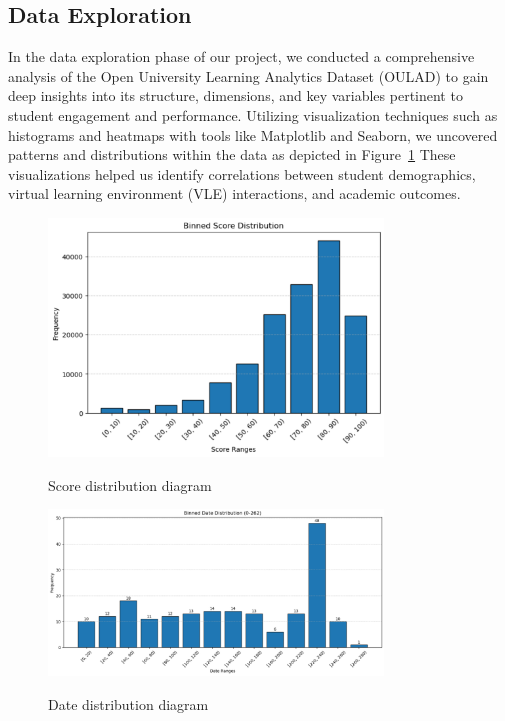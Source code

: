 \subsection*{Data Exploration}
In the data exploration phase of our project, we conducted a comprehensive analysis of the Open University Learning Analytics Dataset (OULAD) to gain deep insights into its structure, dimensions, and key variables pertinent to student engagement and performance. Utilizing visualization techniques such as histograms and heatmaps with tools like Matplotlib and Seaborn, we uncovered patterns and distributions within the data as depicted in Figure~\ref{distribution} These visualizations helped us identify correlations between student demographics, virtual learning environment (VLE) interactions, and academic outcomes.

\begin{figure}
  \begin{center}
  \includegraphics[width=3.5in]{photo/distrib.PNG}\\
  \caption{Score distribution diagram}
  \label{distribution}
  \end{center}
\end{figure}

\begin{figure}
  \begin{center}
  \includegraphics[width=3.5in]{photo/uniformdate.PNG}\\
  \caption{Date distribution diagram}
  \label{unidate}
  \end{center}
\end{figure}

